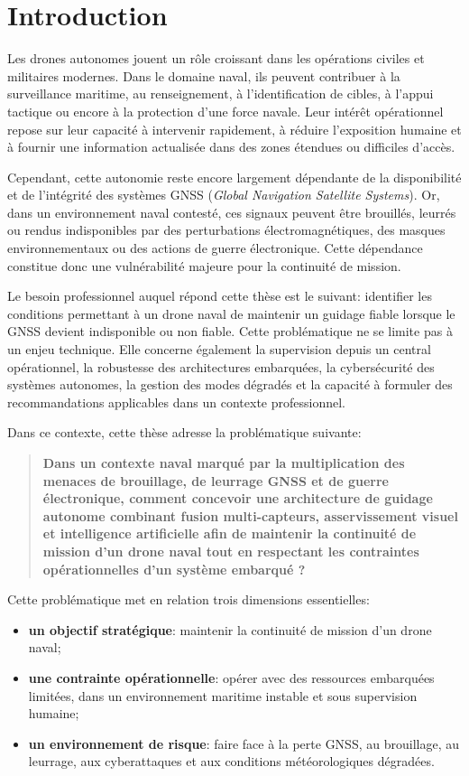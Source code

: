 \documentclass[12pt, a4paper, twoside, openright]{report}
\begin{document}
\chapter{Introduction}
Les drones autonomes jouent un rôle croissant dans les opérations civiles et militaires modernes. Dans le domaine naval, ils peuvent contribuer à la surveillance maritime, au renseignement, à l’identification de cibles, à l’appui tactique ou encore à la protection d’une force navale. Leur intérêt opérationnel repose sur leur capacité à intervenir rapidement, à réduire l’exposition humaine et à fournir une information actualisée dans des zones étendues ou difficiles d’accès.

Cependant, cette autonomie reste encore largement dépendante de la disponibilité et de l’intégrité des systèmes GNSS (\textit{Global Navigation Satellite Systems}). Or, dans un environnement naval contesté, ces signaux peuvent être brouillés, leurrés ou rendus indisponibles par des perturbations électromagnétiques, des masques environnementaux ou des actions de guerre électronique. Cette dépendance constitue donc une vulnérabilité majeure pour la continuité de mission.

Le besoin professionnel auquel répond cette thèse est le suivant: identifier les conditions permettant à un drone naval de maintenir un guidage fiable lorsque le GNSS devient indisponible ou non fiable. Cette problématique ne se limite pas à un enjeu technique. Elle concerne également la supervision depuis un central opérationnel, la robustesse des architectures embarquées, la cybersécurité des systèmes autonomes, la gestion des modes dégradés et la capacité à formuler des recommandations applicables dans un contexte professionnel.

Dans ce contexte, cette thèse adresse la problématique suivante:
\begin{quote}
    \textbf{Dans un contexte naval marqué par la multiplication des menaces de brouillage, de leurrage GNSS et de guerre électronique, comment concevoir une architecture de guidage autonome combinant fusion multi-capteurs, asservissement visuel et intelligence artificielle afin de maintenir la continuité de mission d’un drone naval tout en respectant les contraintes opérationnelles d’un système embarqué ?}
\end{quote}

Cette problématique met en relation trois dimensions essentielles:
\begin{itemize}
    \item \textbf{un objectif stratégique}: maintenir la continuité de mission d’un drone naval;
    \item \textbf{une contrainte opérationnelle}: opérer avec des ressources embarquées limitées, dans un environnement maritime instable et sous supervision humaine;
    \item \textbf{un environnement de risque}: faire face à la perte GNSS, au brouillage, au leurrage, aux cyberattaques et aux conditions météorologiques dégradées.
\end{itemize}
\end{document}

